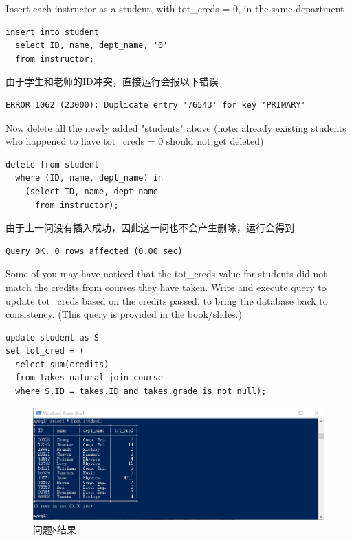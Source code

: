 \documentclass[logo,reportComp]{thesis}
\begin{document}
\begin{question}
\normalfont 
Insert each instructor as a student, with tot\_creds = 0, in the same department
\end{question}
\begin{answer}\mbox{}\par
\begin{lstlisting}
insert into student
  select ID, name, dept_name, '0'
  from instructor;
\end{lstlisting}
由于学生和老师的ID冲突，直接运行会报以下错误
\begin{lstlisting}
ERROR 1062 (23000): Duplicate entry '76543' for key 'PRIMARY'
\end{lstlisting}
\end{answer}

\begin{question}
\normalfont 
Now delete all the newly added "students" above (note: already existing students who happened to have tot\_creds = 0 should not get deleted)
\end{question}
\begin{answer}\mbox{}\par
\begin{lstlisting}
delete from student
  where (ID, name, dept_name) in
    (select ID, name, dept_name
      from instructor);
\end{lstlisting}
由于上一问没有插入成功，因此这一问也不会产生删除，运行会得到
\begin{lstlisting}
Query OK, 0 rows affected (0.00 sec)
\end{lstlisting}
\end{answer}

\begin{question}
\normalfont 
Some of you may have noticed that the tot\_creds value for students did not match the credits from courses they have taken. Write and execute query to update tot\_creds based on the credits passed, to bring the database back to consistency. (This query is provided in the book/slides.)
\end{question}
\begin{answer}\mbox{}\par
\begin{lstlisting}
update student as S
set tot_cred = (
  select sum(credits)
  from takes natural join course
  where S.ID = takes.ID and takes.grade is not null);
\end{lstlisting}
\begin{figure}[H]
\centering
\includegraphics[width=\linewidth]{fig/Q8.png}
\caption{问题8结果}
\end{figure}
\end{answer}
\end{document}
